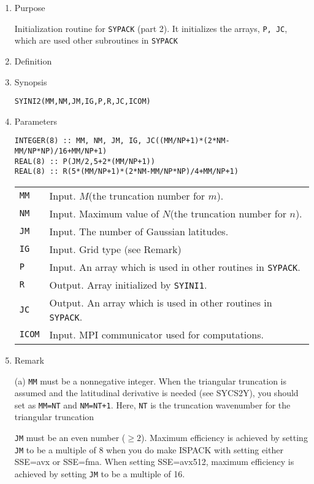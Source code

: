 \documentclass[a4paper]{scrartcl}
\begin{document}
\begin{enumerate}

\item Purpose

Initialization routine for \texttt{SYPACK} (part 2).
It initializes the arrays, \texttt{P, JC},
which are used other subroutines in \texttt{SYPACK}
  
\item Definition

\item Synopsis 
    
\texttt{SYINI2(MM,NM,JM,IG,P,R,JC,ICOM)}
  
\item Parameters

\begin{verbatim}  
INTEGER(8) :: MM, NM, JM, IG, JC((MM/NP+1)*(2*NM-MM/NP*NP)/16+MM/NP+1)
REAL(8) :: P(JM/2,5+2*(MM/NP+1))
REAL(8) :: R(5*(MM/NP+1)*(2*NM-MM/NP*NP)/4+MM/NP+1)
\end{verbatim}  
    
\begin{tabular}{ll}

\texttt{MM} & Input. $M$(the truncation number for $m$).\\
\texttt{NM} & Input. Maximum value of $N$(the truncation 
  number for $n$).\\
\texttt{JM}  & Input. The number of Gaussian latitudes.\\
\texttt{IG}  & Input. Grid type (see Remark)\\  
\texttt{P}  & Input. An array which is used in other routines in
\texttt{SYPACK}.\\
\texttt{R}  & Output. Array initialized by \texttt{SYINI1}.\\
\texttt{JC}  & Output. An array which is used in other routines in
\texttt{SYPACK}.\\
\texttt{ICOM} & Input. MPI communicator used for computations.
\end{tabular}

\item Remark

(a) \texttt{MM} must be a nonnegative integer.
 When the triangular truncation is assumed and
 the latitudinal derivative is needed (see SYCS2Y),
 you should set as \texttt{MM=NT} and \texttt{NM=NT+1}.
 Here, \texttt{NT} is the truncation wavenumber for 
  the triangular truncation
  
\texttt{JM} must be an even number ($\ge 2$).
Maximum efficiency is achieved by setting \texttt{JM} to be 
a multiple of 8 when you do make ISPACK with setting either
SSE=avx or SSE=fma.
When setting SSE=avx512, maximum efficiency is achieved
by setting \texttt{JM} to be a multiple of 16.


\end{enumerate}
\end{document}
